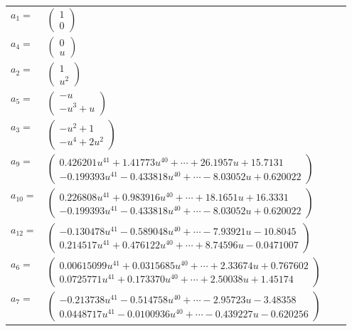 \documentclass[1p]{elsarticle_modified}
\theoremstyle{definition}
\begin{document}
\begin{tabular}{m{7pt} m{180pt} m{7pt} m{180pt} }
\flushright $a_{1}=$&$\begin{pmatrix}1\\0\end{pmatrix}$ \\
\flushright $a_{4}=$&$\begin{pmatrix}0\\u\end{pmatrix}$ \\
\flushright $a_{2}=$&$\begin{pmatrix}1\\u^2\end{pmatrix}$ \\
\flushright $a_{5}=$&$\begin{pmatrix}- u\\- u^3+u\end{pmatrix}$ \\
\flushright $a_{3}=$&$\begin{pmatrix}- u^2+1\\- u^4+2 u^2\end{pmatrix}$ \\
\flushright $a_{9}=$&$\begin{pmatrix}0.426201 u^{41}+1.41773 u^{40}+\cdots+26.1957 u+15.7131\\-0.199393 u^{41}-0.433818 u^{40}+\cdots-8.03052 u+0.620022\end{pmatrix}$ \\
\flushright $a_{10}=$&$\begin{pmatrix}0.226808 u^{41}+0.983916 u^{40}+\cdots+18.1651 u+16.3331\\-0.199393 u^{41}-0.433818 u^{40}+\cdots-8.03052 u+0.620022\end{pmatrix}$ \\
\flushright $a_{12}=$&$\begin{pmatrix}-0.130478 u^{41}-0.589048 u^{40}+\cdots-7.93921 u-10.8045\\0.214517 u^{41}+0.476122 u^{40}+\cdots+8.74596 u-0.0471007\end{pmatrix}$ \\
\flushright $a_{6}=$&$\begin{pmatrix}0.00615099 u^{41}+0.0315685 u^{40}+\cdots+2.33674 u+0.767602\\0.0725771 u^{41}+0.173370 u^{40}+\cdots+2.50038 u+1.45174\end{pmatrix}$ \\
\flushright $a_{7}=$&$\begin{pmatrix}-0.213738 u^{41}-0.514758 u^{40}+\cdots-2.95723 u-3.48358\\0.0448717 u^{41}-0.0100936 u^{40}+\cdots-0.439227 u-0.620256\end{pmatrix}$ \\

\end{tabular}
\end{document}
